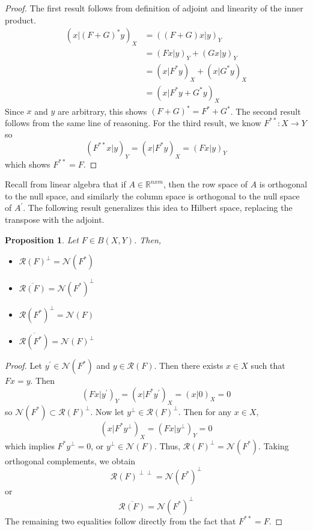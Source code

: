 \documentclass[12pt]{article}
\newtheorem{prop}{Proposition}
\begin{document}
\begin{proof} 
The first result follows from definition of adjoint and linearity of the inner product. 
\begin{align*} 
(x|(F + G)^*y)_X &= ((F + G)x|y)_Y \\
                           &= (Fx|y)_Y + (Gx|y)_Y \\
                           &= (x|F^*y)_X + (x|G^*y)_X \\
                           &= (x|F^*y + G^*y)_X
\end{align*} 
Since $x$ and $y$ are arbitrary, this shows $(F + G)^* = F^* + G^*$. The second result follows from the 
same line of reasoning. For the third result, we know $F^{**}: X \to Y$ so 
\begin{equation*} 
(F^{**}x|y)_Y = (x|F^*y)_X = (Fx|y)_Y
\end{equation*} 
which shows $F^{**} = F$.
\end{proof} 

Recall from linear algebra that if $A \in \mathbb{R}^{n x m}$, then the row space of $A$ is orthogonal to 
the null space, and similarly the column space is orthogonal to the null space of $A^\prime$. The following
result generalizes this idea to Hilbert space, replacing the transpose with the adjoint. 

\begin{prop} \label{subspace_equalities}
Let $F \in B(X, Y)$. Then, 
\begin{itemize} 
\item $\mathcal{R}(F)^\perp = \mathcal{N}(F^*)$
\item $\overline{\mathcal{R}(F)} = \mathcal{N}(F^*)^\perp$
\item $\mathcal{R}(F^*)^\perp = \mathcal{N}(F)$
\item $\overline{\mathcal{R}(F^*)} = \mathcal{N}(F)^\perp$
\end{itemize} 
\end{prop} 

\begin{proof} 
Let $y^\prime \in \mathcal{N}(F^*)$ and $y \in \mathcal{R}(F)$. Then there exists $x \in X$
such that $Fx = y$. Then \[(Fx|y^\prime)_Y = (x|F^*y^\prime)_X = (x|0)_X = 0\]
so $\mathcal{N}(F^*) \subset \mathcal{R}(F)^\perp$. Now let $y^\perp \in \mathcal{R}(F)^\perp$. 
Then for any $x \in X$, \[(x|F^*y^\perp)_X = (Fx|y^\perp)_Y = 0\]
which implies $F^*y^\perp = 0$, or $y^\perp \in \mathcal{N}(F)$. 
Thus, $\mathcal{R}(F)^\perp = \mathcal{N}(F^*)$. Taking orthogonal complements, we obtain 
\[\mathcal{R}(F)^{\perp\perp} = \mathcal{N}(F^*)^\perp\]
or 
\[\overline{\mathcal{R}(F)} = \mathcal{N}(F^*)^\perp\]
The remaining two equalities follow directly from the fact that $F^{**} = F$. 
\end{proof} 
\end{document}
